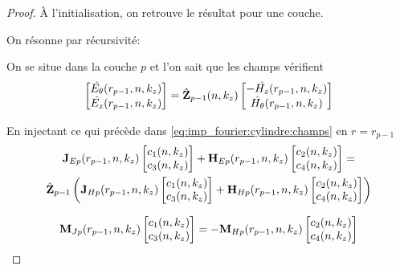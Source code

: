     \begin{proof}
      À l'initialisation, on retrouve le résultat pour une couche.

      On résonne par récursivité:

      On se situe dans la couche \(p\) et l'on sait que les champs vérifient
      \begin{equation}
        \begin{bmatrix}
          \hat{E_\theta}(r_{p-1},n,k_z)\\
          \hat{E_z}(r_{p-1},n,k_z)\\
        \end{bmatrix}
        =
        \hat {\mathbf{Z}}_{p-1}(n,k_z)
        \begin{bmatrix}
          -\hat{H_z}(r_{p-1},n,k_z)\\
          \hat{H_\theta}(r_{p-1},n,k_z)\\
        \end{bmatrix}
      \end{equation}

      En injectant ce qui précède dans \eqref{eq:imp_fourier:cylindre:champs} en \(r = r_{p-1}\)
      \begin{multline}
        \mathbf{J}_{Ep}(r_{p-1},n,k_z)
        \begin{bmatrix}
          c_1(n,k_z) \\
          c_3(n,k_z)
        \end{bmatrix}
        +
        \mathbf{H}_{Ep}(r_{p-1},n,k_z)
        \begin{bmatrix}
          c_2(n,k_z) \\
          c_4(n,k_z)
        \end{bmatrix}
        =
        \\
        \hat {\mathbf{Z}}_{p-1}
        \left(
          \mathbf{J}_{Hp}(r_{p-1},n,k_z)
          \begin{bmatrix}
            c_1(n,k_z) \\
            c_3(n,k_z)
          \end{bmatrix}
          +
          \mathbf{H}_{Hp}(r_{p-1},n,k_z)
          \begin{bmatrix}
            c_2(n,k_z) \\
            c_4(n,k_z)
          \end{bmatrix}
        \right)
      \end{multline}

      \begin{equation}
        \mathbf{M}_{Jp}(r_{p-1},n,k_z)
        \begin{bmatrix}
          c_1(n,k_z) \\
          c_3(n,k_z)
        \end{bmatrix}
        =
        -\mathbf{M}_{Hp}(r_{p-1},n,k_z)
        \begin{bmatrix}
          c_2(n,k_z) \\
          c_4(n,k_z)
        \end{bmatrix}
      \end{equation}


\end{proof}

